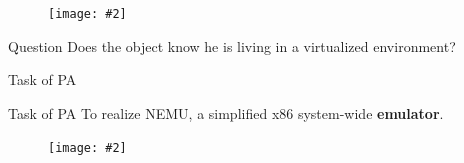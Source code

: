 \documentclass{beamer}
\newcommand{\fignocaption}[2]{
	\begin{figure}[htp]
		\centering
		\texttt{[image: \#2]}
	\end{figure}
}
\begin{document}
\begin{frame}{}
\fignocaption{scale=0.3}{emulate.png}
\begin{exampleblock}{Question}
	Does the object know he is living in a virtualized environment?
\end{exampleblock}

\end{frame}


\begin{frame}{Task of PA}
	\begin{block}{Task of PA}
		To realize \alert{NEMU}, a  simplified x86 system-wide \textbf{emulator}.
	\end{block}
%
%
%
\fignocaption{scale=0.3}{emulator.png}
\end{frame}
\end{document}
